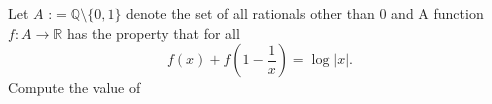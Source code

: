Let $A \text{ :}= \mathbb{Q}\setminus \{0,1\}$ denote the set of all rationals other than $0$ and   A function $f:A\to \mathbb{R}$ has the property that for all  \[f(x)+f\left(1-\dfrac{1}{x}\right)=\log |x|.\]  Compute the value of 